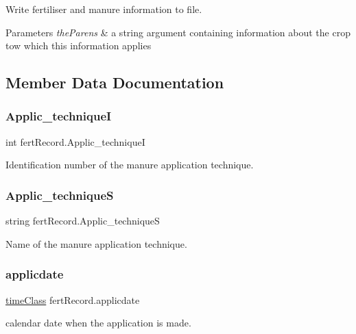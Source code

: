 Write fertiliser and manure information to file. 


\begin{DoxyParams}{Parameters}
{\em the\+Parens} & a string argument containing information about the crop tow which this information applies \\
\hline
\end{DoxyParams}


\subsection{Member Data Documentation}
\mbox{\label{classfert_record_acd5d93cefcdeac346e4f2da0d794b02e}} 
\subsubsection{\texorpdfstring{Applic\_techniqueI}{Applic\_techniqueI}}
{\footnotesize\ttfamily int fert\+Record.\+Applic\+\_\+techniqueI}

Identification number of the manure application technique. \mbox{\label{classfert_record_af8971d0933ac0e105cff348940b15e72}} 
\subsubsection{\texorpdfstring{Applic\_techniqueS}{Applic\_techniqueS}}
{\footnotesize\ttfamily string fert\+Record.\+Applic\+\_\+techniqueS}

Name of the manure application technique. \mbox{\label{classfert_record_abb3dcc8fe64aef946d15be6992bc0622}} 
\subsubsection{\texorpdfstring{applicdate}{applicdate}}
{\footnotesize\ttfamily \mbox{\hyperlink{classtime_class}{time\+Class}} fert\+Record.\+applicdate}

calendar date when the application is made. \mbox{\label{classfert_record_a7f27f6a12e169928db44a8bb073dca7d}} 
